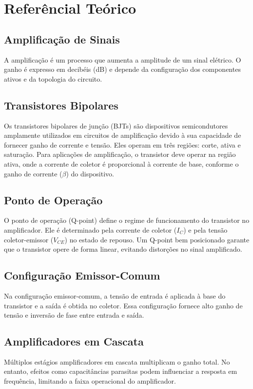 \section{Referêncial Teórico}

\subsection{Amplificação de Sinais}
A amplificação é um processo que aumenta a amplitude de um sinal elétrico. O ganho é expresso em decibéis (dB) e depende da configuração dos componentes ativos e da topologia do circuito.

\subsection{Transistores Bipolares}
Os transistores bipolares de junção (BJTs) são dispositivos semicondutores amplamente utilizados em circuitos de amplificação devido à sua capacidade de fornecer ganho de corrente e tensão. Eles operam em três regiões: corte, ativa e saturação. Para aplicações de amplificação, o transistor deve operar na região ativa, onde a corrente de coletor é proporcional à corrente de base, conforme o ganho de corrente ($\beta$) do dispositivo.

\subsection{Ponto de Operação}

O ponto de operação (Q-point) define o regime de funcionamento do transistor no amplificador. Ele é determinado pela corrente de coletor ($I_C$) e pela tensão coletor-emissor ($V_{CE}$) no estado de repouso. Um Q-point bem posicionado garante que o transistor opere de forma linear, evitando distorções no sinal amplificado.

\subsection{Configuração Emissor-Comum}
Na configuração emissor-comum, a tensão de entrada é aplicada à base do transistor e a saída é obtida no coletor. Essa configuração fornece alto ganho de tensão e inversão de fase entre entrada e saída.

\subsection{Amplificadores em Cascata}
Múltiplos estágios amplificadores em cascata multiplicam o ganho total. No entanto, efeitos como capacitâncias parasitas podem influenciar a resposta em frequência, limitando a faixa operacional do amplificador.
